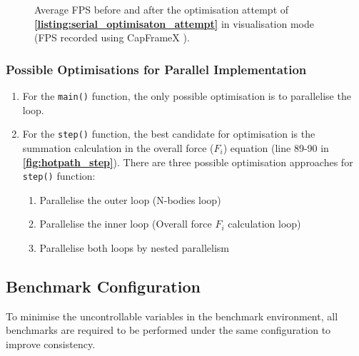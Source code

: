 \documentclass[12pt, a4paper]{article}
\let\oldcref\cref
\renewcommand{\cref}[1]{\textbf{\oldcref{#1}}}
\begin{document}
\begin{figure}[h]
  \centering
  \caption{Average FPS before and after the optimisation attempt of \cref{listing:serial_optimisaton_attempt}
    in visualisation mode (FPS recorded using CapFrameX \cite{capframex}).}
  \label{fig:serial_optimisation_fps}
\end{figure}

\subsubsection{Possible Optimisations for Parallel Implementation}
\begin{enumerate}
  \item For the \texttt{main()} function, the only possible optimisation is to parallelise the loop.

  \item For the \texttt{step()} function, the best candidate for optimisation is the summation
  calculation in the overall force ($F_i$) equation (line 89-90 in \cref{fig:hotpath_step}). There are
  three possible optimisation approaches for \texttt{step()} function:
  \begin{enumerate}
    \item Parallelise the outer loop (N-bodies loop)
    \item Parallelise the inner loop (Overall force \(F_i\) calculation loop)
    \item Parallelise both loops by nested parallelism
  \end{enumerate}
\end{enumerate}

\subsection{Benchmark Configuration}
To minimise the uncontrollable variables in the benchmark environment, all benchmarks are required
to be performed under the same configuration to improve consistency.
\end{document}
